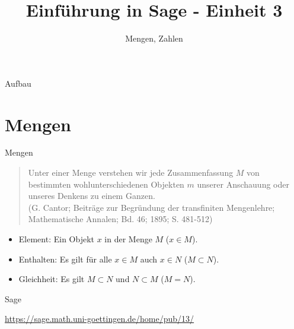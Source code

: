 \documentclass[notes=hide,hyperref={dvipdfmx,pdfpagelabels=false}]{beamer}
\title{Einführung in Sage - Einheit 3}
\subtitle{Mengen, Zahlen}
\begin{document}
\maketitle

\begin{frame}{Aufbau}
\tableofcontents
\end{frame}

\section{Mengen}


\begin{frame}{Mengen}
\begin{quote}
Unter einer \alert{Menge} verstehen wir jede Zusammenfassung $M$ von bestimmten wohlunterschiedenen Objekten $m$ unserer Anschauung oder unseres Denkens zu einem Ganzen.\\
{\tiny (G. Cantor; Beiträge zur Begründung der transfiniten Mengenlehre; Mathematische Annalen; Bd. 46; 1895; S. 481-512) }
\end{quote}
 \begin{itemize}
\item \alert{Element}: Ein Objekt $x$ in der Menge $M$ (\alert{$x \in  M$}). 
\item \alert{Enthalten}: Es gilt für alle $x \in M$ auch $x \in N$ (\alert{$M \subset N$}).
\item \alert{Gleichheit}: Es gilt $M\subset N$ und $N \subset M$ (\alert{$M=N$}).
\end{itemize}
\end{frame}


\begin{frame}{Sage}
\begin{center}
\url{https://sage.math.uni-goettingen.de/home/pub/13/}
\end{center}
\end{frame}



\end{document}
